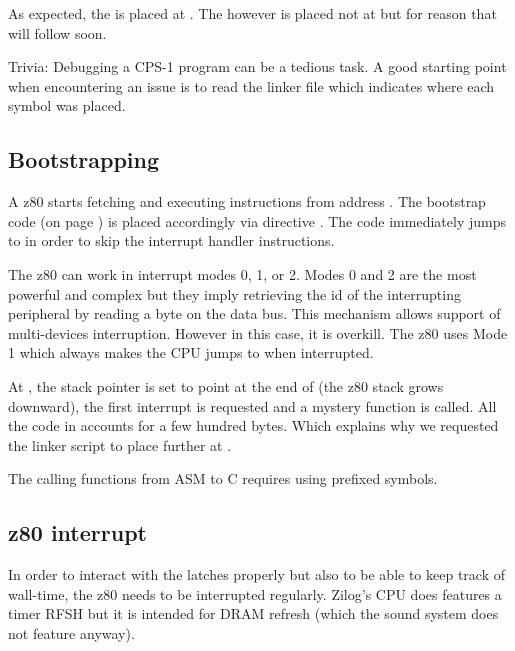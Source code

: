 

As expected, the  is placed at . The  however is placed not at  but  for reason that will follow soon.

\begin{trivia}
Trivia: Debugging a CPS-1 program can be a tedious task. A good starting point when encountering an issue is to read the linker  file which indicates where each symbol was placed.
\end{trivia}

\subsection{Bootstrapping}
A z80 starts fetching and executing instructions from address . The bootstrap code  (on page \pageref{z80_crt0}) is placed accordingly via directive . The code immediately jumps to  in order to skip the interrupt handler instructions. 

The z80 can work in interrupt modes 0, 1, or 2. Modes 0 and 2 are the most powerful and complex but they imply retrieving the id of the interrupting peripheral by reading a byte on the data bus. This mechanism allows support of multi-devices interruption. However in this case, it is overkill. The z80 uses Mode 1 which always makes the CPU jumps to  when interrupted.

At , the stack pointer  is set to point at the end of  (the z80 stack grows downward), the first interrupt is requested and a mystery  function is called. All the code in  accounts for a few hundred bytes. Which explains why we requested the linker script to place  further at .

\begin{trivia}
The calling functions from ASM to C requires using \icode{\_} prefixed symbols.
\end{trivia}
\pagebreak


\label{z80_crt0}







\subsection{z80 interrupt}
In order to interact with the latches properly but also to be able to keep track of wall-time, the z80 needs to be interrupted regularly. Zilog's CPU does features a timer RFSH but it is intended for DRAM refresh (which the sound system does not feature anyway).

